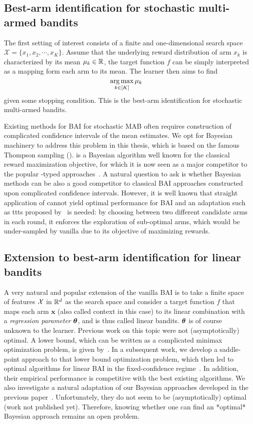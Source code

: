 \subsection{Best-arm identification for stochastic multi-armed bandits}

The first setting of interest consists of a finite and one-dimensional search space $\mathcal{X} = \{x_1,x_2,\cdots,x_K\}$. Assume that the underlying reward distribution of arm $x_k$ is characterized by its mean $\mu_k\in\mathbb{R}$, the target function $f$ can be simply interpreted as a mapping form each arm to its mean. The learner then aims to find
\[
    \operatorname*{arg\,max}_{k\in[K]} \mu_k\,
\]
given some stopping condition. This is the best-arm identification for stochastic multi-armed bandits.

Existing methods for BAI for stochastic MAB often requires construction of complicated confidence intervals of the mean estimates. We opt for Bayesian machinery to address this problem in this thesis, which is based on the famous Thompson sampling (\TS). \TS is a Bayesian algorithm well known for the classical reward maximization objective, for which it is now seen as a major competitor to the popular \UCB-typed approaches~\citep{auer2002ucb}. A natural question to ask is whether Bayesian methods can be also a good competitor to classical BAI approaches constructed upon complicated confidence intervals. However, it is well known that straight application of \TS cannot yield optimal performance for BAI and an adaptation such as \gls{ttts} proposed by~\cite{russo2016ttts} is needed: by choosing between two different candidate arms in each round, it enforces the exploration of sub-optimal arms, which would be under-sampled by vanilla \TS due to its objective of maximizing rewards. 

\subsection{Extension to best-arm identification for linear bandits}

A very natural and popular extension of the vanilla BAI is to take a finite space of features $\mathcal{X}$ in $\mathbb{R}^d$ as the search space and consider a target function $f$ that maps each arm $\mathbf{x}$ (also called context in this case) to its linear combination with a \emph{regression parameter} ${\boldsymbol \theta}$, and is thus called linear bandits. ${\boldsymbol \theta}$ is of course unknown to the learner. Previous work on this topic were not (asymptotically) optimal. A lower bound, which can be written as a complicated minimax optimization problem, is given by~\cite{garivier2016tracknstop}. In a subsequent work, we develop a saddle-point approach to that lower bound optimization problem, which then led to optimal algorithms for linear BAI in the fixed-confidence regime~\citep{degenne2020game}. In addition, their empirical performance is competitive with the best existing algorithms. We also investigate a natural adaptation of our Bayesian approaches developed in the previous paper~\citep{shang2020t3c}. Unfortunately, they do not seem to be (asymptotically) optimal (work not published yet). Therefore, knowing whether one can find an *optimal* Bayesian approach remains an open problem.

